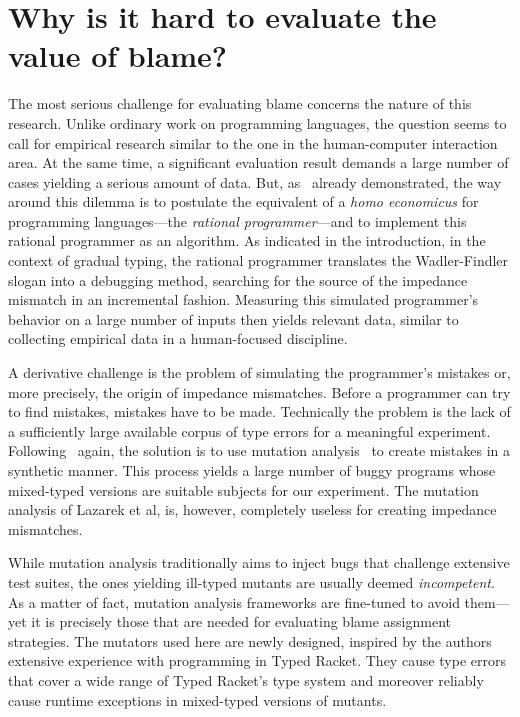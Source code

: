 
\section{Why is it hard to evaluate the value of blame?}
\label{sec:challenges}

The most serious challenge for evaluating blame concerns 
the nature of this research. Unlike ordinary
work on programming languages, the question seems to call for empirical research
similar to the one in the human-computer interaction area. At the same time, a
significant evaluation result demands a large number of cases yielding a serious
amount of data. But, as~\citet{lksfd-popl-2020} already demonstrated, the way
around this dilemma is to postulate the equivalent of a {\it homo economicus\/}
for programming languages---the {\em rational programmer\/}---and to implement
this rational programmer as an algorithm.  As indicated in the introduction, in
the context of gradual typing, the rational programmer translates the
Wadler-Findler slogan into a debugging method, searching for the source of the
impedance mismatch in an incremental fashion. Measuring this simulated
programmer's behavior on a large number of inputs then yields relevant 
data, similar to collecting empirical data in a human-focused discipline. 

A derivative challenge is the problem of simulating the programmer's
mistakes or, more precisely, the origin of impedance
mismatches. Before a programmer can try to find mistakes, mistakes
have to be made. Technically the problem is the lack of a sufficiently
large available corpus of type errors for a meaningful experiment.
Following~\citet{lksfd-popl-2020} again, the solution is to use
mutation analysis~\cite{lipton1971fault, demillo1978hints,
jia2011analysis} to create mistakes in a synthetic manner. This
process yields a large number of buggy programs whose mixed-typed
versions are suitable subjects for our experiment.  The mutation
analysis of Lazarek et al, is, however, completely useless for
creating impedance mismatches.

While mutation analysis traditionally aims to inject bugs that challenge
extensive test suites, the ones yielding ill-typed mutants are usually deemed
\emph{incompetent}. As a matter of fact, mutation analysis frameworks are
fine-tuned to avoid them---yet it is precisely those that are needed for
evaluating blame assignment strategies. The mutators used here are newly designed,
inspired by the authors extensive experience with programming in Typed Racket.
They cause type errors that cover a wide range of Typed Racket's type system and moreover
reliably cause runtime exceptions in mixed-typed versions of mutants.

